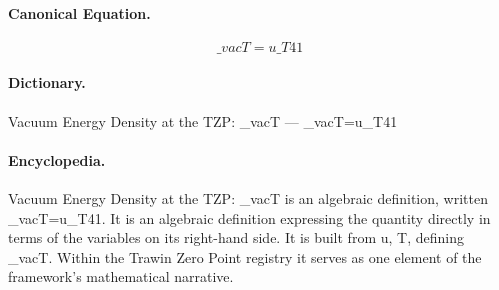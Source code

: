 \paragraph{Canonical Equation.}
\[
\_vacT=u\_T41
\]

\paragraph{Dictionary.}
Vacuum Energy Density at the TZP: \_vacT — \_vacT=u\_T41

\paragraph{Encyclopedia.}
Vacuum Energy Density at the TZP: \_vacT is an algebraic definition, written \_vacT=u\_T41. It is an algebraic definition expressing the quantity directly in terms of the variables on its right-hand side. It is built from u, T, defining \_vacT. Within the Trawin Zero Point registry it serves as one element of the framework's mathematical narrative.

